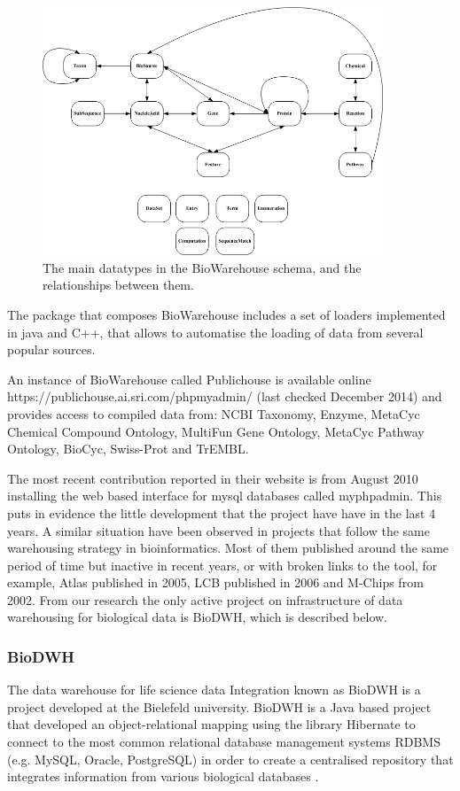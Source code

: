 \begin{figure}  
\centering
\includegraphics[width=4in]{figures/biowarehouse.png}
\caption[Original BioWarehouse schema.]{The main datatypes in the BioWarehouse schema, and the relationships between them.
\label{fig:biowarehouse}}
\end{figure}

The package that composes BioWarehouse includes a set of loaders implemented in java and C++, that allows to automatise the loading of data from several popular sources. 

An instance of BioWarehouse called Publichouse is available online https://publichouse.ai.sri.com/phpmyadmin/ (last checked December 2014) and provides access to compiled data from: NCBI Taxonomy, Enzyme, MetaCyc Chemical Compound Ontology, MultiFun Gene Ontology, MetaCyc Pathway Ontology, BioCyc, Swiss-Prot and TrEMBL.

The most recent contribution reported in their website is from August 2010 installing the web based interface for mysql databases called myphpadmin. This puts in evidence the little development that the project have have in the last 4 years. A similar situation have been observed in projects that follow the same warehousing strategy in bioinformatics. Most of them published around the same period of time but inactive in recent years, or with broken links to the tool, for example, Atlas \cite{SHA2005} published in 2005, LCB\cite{AME2006} published in 2006 and M-Chips \cite{FEL2002} from 2002. From our research the only active project on infrastructure of data warehousing for biological data is BioDWH, which is described below.

\subsubsection{BioDWH}
The data warehouse for life science data Integration known as BioDWH is a project developed at  the Bielefeld university. BioDWH is a Java based project that developed an object-relational mapping using the library Hibernate to connect to the most common relational database management systems RDBMS (e.g. MySQL, Oracle, PostgreSQL) in order to create a centralised repository that integrates information from various biological databases \cite{TOP2008}.

